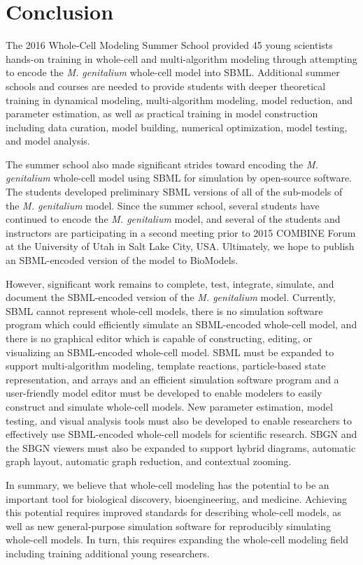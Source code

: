 \documentclass[journal,transmag]{IEEEtran}
\begin{document}
\section{Conclusion}
The 2016 Whole-Cell Modeling Summer School provided 45 young scientists hands-on training in whole-cell and multi-algorithm modeling through attempting to encode the \textit{M. genitalium} whole-cell model into SBML. Additional summer schools and courses are needed to provide students with deeper theoretical training in dynamical modeling, multi-algorithm modeling, model reduction, and parameter estimation, as well as practical training in model construction including data curation, model building, numerical optimization, model testing, and model analysis.

The summer school also made significant strides toward encoding the \textit{M. genitalium} whole-cell model using SBML for simulation by open-source software. The students developed preliminary SBML versions of all of the sub-models of the \textit{M. genitalium} model. Since the summer school, several students have continued to encode the \textit{M. genitalium} model, and several of the students and instructors are participating in a second meeting prior to 2015 COMBINE Forum at the University of Utah in Salt Lake City, USA. Ultimately, we hope to publish an SBML-encoded version of the model to BioModels. 

However, significant work remains to complete, test, integrate, simulate, and document the SBML-encoded version of the \textit{M. genitalium} model. Currently, SBML cannot represent whole-cell models, there is no simulation software program which could efficiently simulate an SBML-encoded whole-cell model, and there is no graphical editor which is capable of constructing, editing, or visualizing an SBML-encoded whole-cell model. SBML must be expanded to support multi-algorithm modeling, template reactions, particle-based state representation, and arrays and an efficient simulation software program and a user-friendly model editor must be developed to enable modelers to easily construct and simulate whole-cell models. New parameter estimation, model testing, and visual analysis tools must also be developed to enable researchers to effectively use SBML-encoded whole-cell models for scientific research. SBGN and the SBGN viewers must also be expanded to support hybrid diagrams, automatic graph layout, automatic graph reduction, and contextual zooming.

In summary, we believe that whole-cell modeling has the potential to be an important tool for biological discovery, bioengineering, and medicine. Achieving this potential requires improved standards for describing whole-cell models, as well as new general-purpose simulation software for reproducibly simulating whole-cell models. In turn, this requires expanding the whole-cell modeling field including training additional young researchers.
\end{document}
